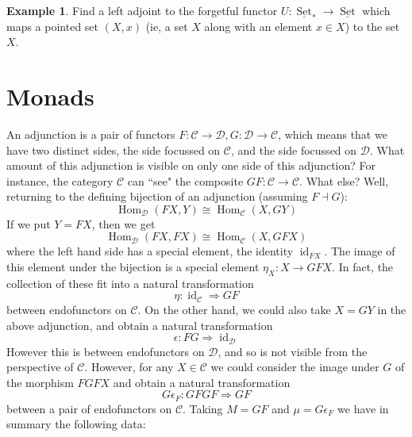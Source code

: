 \documentclass[12pt]{article}
\theoremstyle{plain}
\theoremstyle{definition}
\newtheorem{example}[thm]{Example}
\newcommand{\scr}[1]{\mathscr{#1}}
\newcommand{\lto}{\longrightarrow}
\begin{document}
\begin{example}
	Find a left adjoint to the forgetful functor $U: \underline{\operatorname{Set}}_\ast \lto \underline{\operatorname{Set}}$ which maps a pointed set $(X,x)$ (ie, a set $X$ along with an element $x \in X$) to the set $X$.
	\end{example}

\section{Monads}

An adjunction is a pair of functors $F: \scr{C} \lto \scr{D}, G: \scr{D} \lto \scr{C}$, which means that we have two distinct sides, the side focussed on $\scr{C}$, and the side focussed on $\scr{D}$. What amount of this adjunction is visible on only one side of this adjunction? For instance, the category $\scr{C}$ can ``see" the composite $GF: \scr{C} \lto \scr{C}$. What else? Well, returning to the defining bijection of an adjunction (assuming $F \dashv G$):
\begin{equation}
	\operatorname{Hom}_\scr{D}(FX, Y) \cong \operatorname{Hom}_{\scr{C}}(X, GY)
	\end{equation}
If we put $Y = FX$, then we get
\begin{equation}
	\operatorname{Hom}_\scr{D}(FX, FX) \cong \operatorname{Hom}_{\scr{C}}(X, GFX)
	\end{equation}
where the left hand side has a special element, the identity $\operatorname{id}_{FX}$. The image of this element under the bijection is a special element $\eta_X: X \lto GFX$. In fact, the collection of these fit into a natural transformation
\begin{equation}
	\eta: \operatorname{id}_{\scr{C}} \Rightarrow GF
	\end{equation}
between endofunctors on $\scr{C}$. On the other hand, we could also take $X = GY$ in the above adjunction, and obtain a natural transformation
\begin{equation}
	\epsilon: FG \Rightarrow \operatorname{id}_{\scr{D}}
	\end{equation}
However this is between endofunctors on $\scr{D}$, and so is not visible from the perspective of $\scr{C}$. However, for any $X \in \scr{C}$ we could consider the image under $G$ of the morphism $FGFX$ and obtain a natural transformation
\begin{equation}
	G\epsilon_F: GFGF \Rightarrow GF
	\end{equation}
between a pair of endofunctors on $\scr{C}$. Taking $M = GF$ and $\mu = G\epsilon_F$ we have in summary the following data:
\end{document}
